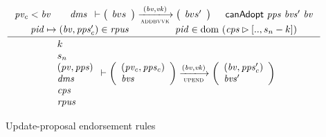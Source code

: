 \begin{figure}[htb]
\begin{equation}
    \inference
    {
      \var{pv_c} < \var{bv}
      &
      {
        \begin{array}{l}
          \var{dms}
        \end{array}
      }
      \vdash
      {
        \left(
          \begin{array}{l}
            bvs
          \end{array}
        \right)
      }
      \trans{addbvvk}{(\var{bv}, \var{vk})}
      {
        \left(
          \begin{array}{l}
            bvs'
          \end{array}
        \right)
      }
      &
      \fun{canAdopt}~\var{pps}~\var{bvs'}~\var{bv}\\
      \var{pid} \mapsto (\var{bv}, \var{pps_c'}) \in \var{rpus}
      & \var{pid} \in \dom~(\var{cps} \restrictrange [.., s_n - k])\\
    }
    {
      {
        \begin{array}{l}
          k\\
          s_n\\
          (\var{pv}, \var{pps})\\
          \var{dms}\\
          \var{cps}\\
          \var{rpus}
        \end{array}
      }
      \vdash
      {
        \left(
          \begin{array}{l}
            (\var{pv_c}, \var{pps_c})\\
            \var{bvs}
          \end{array}
        \right)
      }
      \trans{upend}{(\var{bv}, \var{vk})}
      {
        \left(
          \begin{array}{l}
            (\var{bv}, \var{pps_c'})\\
            \var{bvs'}
          \end{array}
        \right)
      }
    }
  \end{equation}
  \caption{Update-proposal endorsement rules}
  \label{fig:rules:up-end}
\end{figure}


